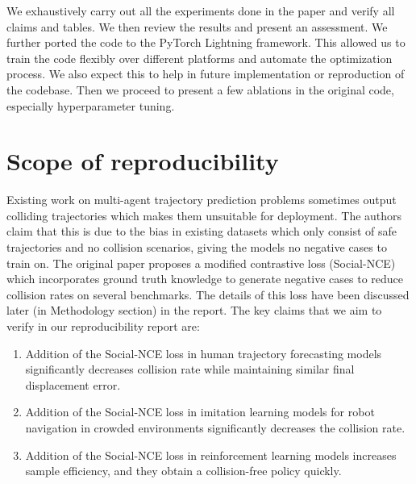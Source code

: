 We exhaustively carry out all the experiments done in the paper and verify all claims and tables. We then review the results and present an assessment. We further ported the code to the PyTorch Lightning framework. This allowed us to train the code flexibly over different platforms and automate the optimization process. We also expect this to help in future implementation or reproduction of the codebase. Then we proceed to present a few ablations in the original code, especially hyperparameter tuning. 


\section{Scope of reproducibility}
\label{sec:claims}

Existing work on multi-agent trajectory prediction problems sometimes output colliding trajectories which makes them unsuitable for deployment. The authors claim that this is due to the bias in existing datasets which only consist of safe trajectories and no collision scenarios, giving the models no negative cases to train on. The original paper proposes a modified contrastive loss (Social-NCE) which incorporates ground truth knowledge to generate negative cases to reduce collision rates on several benchmarks. The details of this loss have been discussed later (in Methodology section) in the report. The key claims that we aim to verify in our reproducibility report are:
\begin{enumerate}
  \item Addition of the Social-NCE loss in human trajectory forecasting models significantly decreases collision rate while maintaining similar final displacement error.
  \item Addition of the Social-NCE loss in imitation learning models for robot navigation in crowded environments significantly decreases the collision rate. 
  \item Addition of the Social-NCE loss in reinforcement learning models increases sample efficiency, and they obtain a collision-free policy quickly. 
\end{enumerate}


